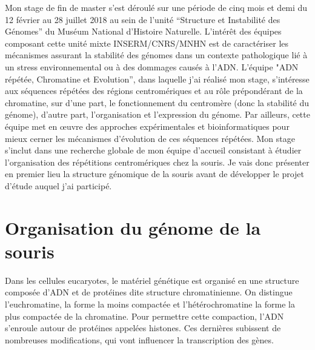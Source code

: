 \documentclass[a4paper,12pt,times]{report}
\begin{document}
Mon stage de fin de master s'est déroulé sur une période de cinq mois et demi du 12 février au 28 juillet 2018 au sein de l'unité ``Structure et Instabilité des Génomes'' du Muséum National d'Histoire Naturelle. 
\newline L'intérêt des équipes composant cette unité mixte INSERM/CNRS/MNHN est de caractériser les mécanismes assurant la stabilité des génomes dans un contexte pathologique lié à un stress environnemental ou à des dommages causés à l'ADN.
L'équipe "ADN répétée, Chromatine et Evolution”, dans laquelle j'ai réalisé mon stage, s’intéresse aux séquences répétées des régions centromériques et au rôle prépondérant de la chromatine, sur d’une part, le fonctionnement du centromère (donc la stabilité du génome), d’autre part, l’organisation et l’expression du génome. Par ailleurs, cette équipe met en œuvre des approches expérimentales et bioinformatiques pour mieux cerner les mécanismes d'évolution de ces séquences répétées.
\newline
Mon stage s'inclut dans une recherche globale de mon équipe d'accueil consistant à étudier l'organisation des répétitions centromériques chez la souris. Je vais donc présenter en premier lieu la structure génomique de la souris avant de développer le projet d'étude auquel j'ai participé.


\section{Organisation du génome de la souris}
Dans les cellules eucaryotes, le matériel génétique est organisé en une structure composée d’ADN et de protéines dite structure chromatinienne.
On distingue  l’euchromatine, la forme la moins compactée et l’hétérochromatine la forme la plus compactée de la chromatine.
Pour permettre cette compaction, l’ADN s’enroule autour de protéines appelées histones.  
Ces dernières subissent de nombreuses modifications, qui vont influencer la transcription des gènes.
\end{document}
